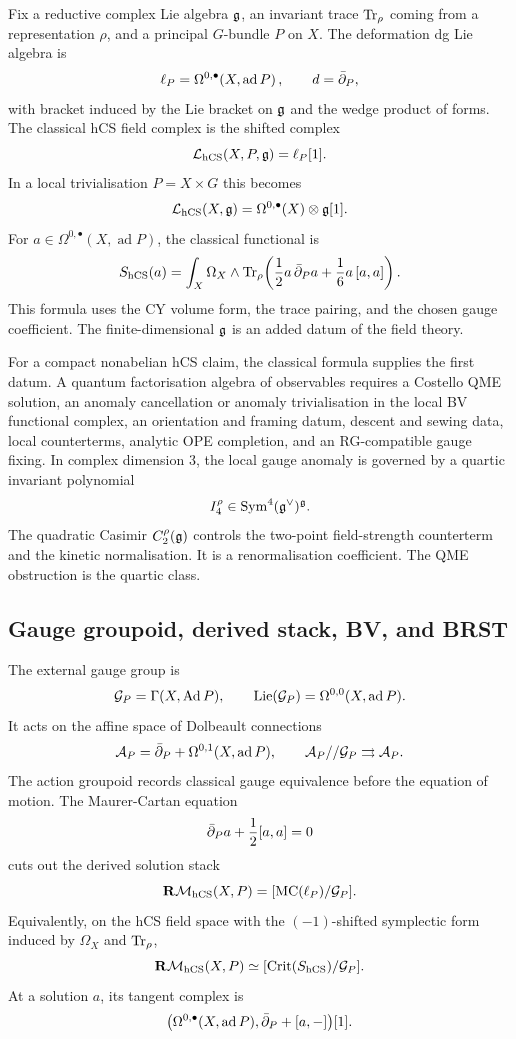 Fix a reductive complex Lie algebra \(\mathfrak{g}\), an invariant trace
\(\operatorname{Tr}_{\rho}\) coming from a representation \(\rho\), and a principal
\(G\)-bundle \(P\) on \(X\). The deformation dg Lie algebra is
\[
  \ell_P
  =
  \Omega^{0,\bullet}\!\left(X,\operatorname{ad}P\right),
  \qquad
  d=\bar\partial_P,
\]
with bracket induced by the Lie bracket on \(\mathfrak{g}\) and the wedge
product of forms. The classical hCS field complex is the shifted
complex
\[
  \mathcal{L}_{\mathrm{hCS}}(X,P,\mathfrak{g})
  =
  \ell_P[1].
\]
In a local trivialisation \(P=X\times G\) this becomes
\[
  \mathcal{L}_{\mathrm{hCS}}(X,\mathfrak{g})
  =
  \Omega^{0,\bullet}(X)\otimes\mathfrak{g}[1].
\]
For \(a\in\Omega^{0,\bullet}(X,\operatorname{ad}P)\), the classical
functional is
\[
  S_{\mathrm{hCS}}(a)
  =
  \int_X \Omega_X\wedge
  \operatorname{Tr}_{\rho}\!\left(
    \frac{1}{2}a\,\bar\partial_P a
    +
    \frac{1}{6}a\,[a,a]
  \right).
\]
This formula uses the CY volume form, the trace pairing, and the chosen
gauge coefficient. The finite-dimensional \(\mathfrak{g}\) is an added datum of
the field theory.

For a compact nonabelian hCS claim, the classical formula supplies the
first datum. A quantum factorisation algebra of observables requires a
Costello QME solution, an anomaly cancellation or anomaly
trivialisation in the local BV functional complex, an orientation and
framing datum, descent and sewing data, local counterterms, analytic
OPE completion, and an RG-compatible gauge fixing. In complex dimension
\(3\), the local gauge anomaly is governed by a quartic invariant
polynomial
\[
  I^\rho_4\in\operatorname{Sym}^4(\mathfrak{g}^\vee)^{\mathfrak{g}} .
\]
The quadratic Casimir \(C^\rho_2(\mathfrak{g})\) controls the two-point
field-strength counterterm and the kinetic normalisation. It is a
renormalisation coefficient. The QME obstruction is the quartic class.

\subsection*{Gauge groupoid, derived stack, BV, and BRST}

The external gauge group is
\[
  \mathcal{G}_P=\Gamma(X,\operatorname{Ad}P),
  \qquad
  \operatorname{Lie}(\mathcal{G}_P)=\Omega^{0,0}(X,\operatorname{ad}P).
\]
It acts on the affine space of Dolbeault connections
\[
  \mathcal{A}_P=\bar\partial_P+\Omega^{0,1}(X,\operatorname{ad}P),
  \qquad
  \mathcal{A}_P//\mathcal{G}_P\rightrightarrows \mathcal{A}_P .
\]
The action groupoid records classical gauge equivalence before the
equation of motion. The Maurer-Cartan equation
\[
  \bar\partial_P a+\frac{1}{2}[a,a]=0
\]
cuts out the derived solution stack
\[
  \mathbf{R}\mathcal{M}_{\mathrm{hCS}}(X,P)
  =
  [\operatorname{MC}(\ell_P)/\mathcal{G}_P].
\]
Equivalently, on the hCS field space with the \((-1)\)-shifted
symplectic form induced by \(\Omega_X\) and \(\operatorname{Tr}_\rho\),
\[
  \mathbf{R}\mathcal{M}_{\mathrm{hCS}}(X,P)
  \simeq
  [\operatorname{Crit}(S_{\mathrm{hCS}})/\mathcal{G}_P].
\]
At a solution \(a\), its tangent complex is
\[
  \bigl(\Omega^{0,\bullet}(X,\operatorname{ad}P),\bar\partial_P+[a,-]\bigr)[1].
\]

